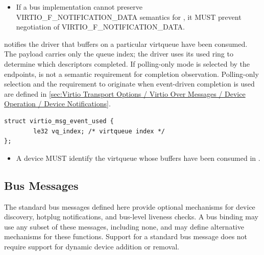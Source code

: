 \begin{itemize}
  \item If a bus implementation cannot preserve
        VIRTIO\_F\_NOTIFICATION\_DATA semantics for , it
        MUST prevent negotiation of VIRTIO\_F\_NOTIFICATION\_DATA.
\end{itemize}


 notifies the driver that buffers on a particular virtqueue
have been consumed. The payload carries only the queue index; the driver uses
its used ring to determine which descriptors completed. If polling-only mode is
selected by the endpoints,  is not a semantic requirement
for completion observation. Polling-only selection and the requirement to
originate  when event-driven completion is used are defined
in
\ref{sec:Virtio Transport Options / Virtio Over Messages / Device Operation / Device Notifications}.

\begin{lstlisting}
struct virtio_msg_event_used {
        le32 vq_index; /* virtqueue index */
};
\end{lstlisting}

\begin{itemize}
  \item A device MUST identify the virtqueue whose buffers have been consumed
        in .
\end{itemize}


\subsection{Bus Messages}\label{sec:Virtio Transport Options / Virtio Over Messages / Bus Messages}

The standard bus messages defined here provide optional mechanisms for device
discovery, hotplug notifications, and bus-level liveness checks. A bus binding
may use any subset of these messages, including none, and may define alternative
mechanisms for these functions. Support for a standard bus message does not
require support for dynamic device addition or removal.

